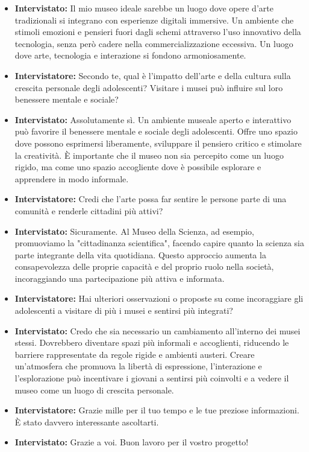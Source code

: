 \documentclass{article}
\begin{document}
\begin{itemize}
    \item \textbf{Intervistato:} Il mio museo ideale sarebbe un luogo dove opere d'arte tradizionali si integrano con esperienze digitali immersive. Un ambiente che stimoli emozioni e pensieri fuori dagli schemi attraverso l'uso innovativo della tecnologia, senza però cadere nella commercializzazione eccessiva. Un luogo dove arte, tecnologia e interazione si fondono armoniosamente.
    
    \item \textbf{Intervistatore:} Secondo te, qual è l'impatto dell'arte e della cultura sulla crescita personale degli adolescenti? Visitare i musei può influire sul loro benessere mentale e sociale?
    
    \item \textbf{Intervistato:} Assolutamente sì. Un ambiente museale aperto e interattivo può favorire il benessere mentale e sociale degli adolescenti. Offre uno spazio dove possono esprimersi liberamente, sviluppare il pensiero critico e stimolare la creatività. È importante che il museo non sia percepito come un luogo rigido, ma come uno spazio accogliente dove è possibile esplorare e apprendere in modo informale.
    
    \item \textbf{Intervistatore:} Credi che l'arte possa far sentire le persone parte di una comunità e renderle cittadini più attivi?
    
    \item \textbf{Intervistato:} Sicuramente. Al Museo della Scienza, ad esempio, promuoviamo la "cittadinanza scientifica", facendo capire quanto la scienza sia parte integrante della vita quotidiana. Questo approccio aumenta la consapevolezza delle proprie capacità e del proprio ruolo nella società, incoraggiando una partecipazione più attiva e informata.
    
    \item \textbf{Intervistatore:} Hai ulteriori osservazioni o proposte su come incoraggiare gli adolescenti a visitare di più i musei e sentirsi più integrati?
    
    \item \textbf{Intervistato:} Credo che sia necessario un cambiamento all'interno dei musei stessi. Dovrebbero diventare spazi più informali e accoglienti, riducendo le barriere rappresentate da regole rigide e ambienti austeri. Creare un'atmosfera che promuova la libertà di espressione, l'interazione e l'esplorazione può incentivare i giovani a sentirsi più coinvolti e a vedere il museo come un luogo di crescita personale.
    
    \item \textbf{Intervistatore:} Grazie mille per il tuo tempo e le tue preziose informazioni. È stato davvero interessante ascoltarti.
    
    \item \textbf{Intervistato:} Grazie a voi. Buon lavoro per il vostro progetto!
\end{itemize}
\end{document}
